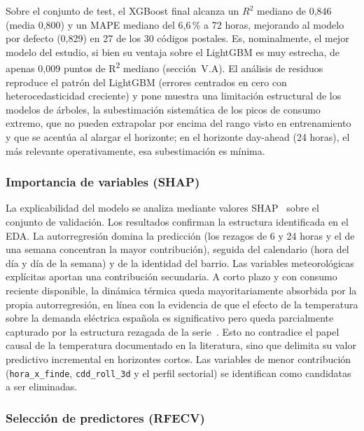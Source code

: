 \documentclass[12pt, a4paper]{article}
\begin{document}
Sobre el conjunto de test, el XGBoost final alcanza un $R^2$ mediano de 0,846 (media 0,800) y un MAPE mediano del 6,6\,\% a 72 horas, mejorando al modelo por defecto (0,829) en 27 de los 30 códigos postales. Es, nominalmente, el mejor modelo del estudio, si bien su ventaja sobre el LightGBM es muy estrecha, de apenas 0,009 puntos de R\textsuperscript{2} mediano (sección~V.A). El análisis de residuos reproduce el patrón del LightGBM (errores centrados en cero con heterocedasticidad creciente) y pone muestra una limitación estructural de los modelos de árboles, la subestimación sistemática de los picos de consumo extremo, que no pueden extrapolar por encima del rango visto en entrenamiento y que se acentúa al alargar el horizonte; en el horizonte day-ahead (24 horas), el más relevante operativamente, esa subestimación es mínima.

\subsubsection{Importancia de variables (SHAP)}

La explicabilidad del modelo se analiza mediante valores SHAP~\cite{lundberg2017} sobre el conjunto de validación. Los resultados confirman la estructura identificada en el EDA. La autorregresión domina la predicción (los rezagos de 6 y 24 horas y el de una semana concentran la mayor contribución), seguida del calendario (hora del día y día de la semana) y de la identidad del barrio. Las variables meteorológicas explícitas aportan una contribución secundaria. A corto plazo y con consumo reciente disponible, la dinámica térmica queda mayoritariamente absorbida por la propia autorregresión, en línea con la evidencia de que el efecto de la temperatura sobre la demanda eléctrica española es significativo pero queda parcialmente capturado por la estructura rezagada de la serie~\cite{pardo2002}. Esto no contradice el papel causal de la temperatura documentado en la literatura, sino que delimita su valor predictivo incremental en horizontes cortos. Las variables de menor contribución (\texttt{hora\_x\_finde}, \texttt{cdd\_roll\_3d} y el perfil sectorial) se identifican como candidatas a ser eliminadas.

\subsubsection{Selección de predictores (RFECV)}
\end{document}
